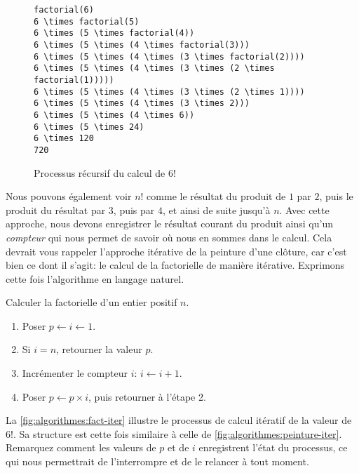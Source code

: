 \begin{figure}
  \centering
  \begin{minipage}{0.67\linewidth}
\begin{Verbatim}[commandchars=\\\{\}]
factorial(6)
6 \times factorial(5)
6 \times (5 \times factorial(4))
6 \times (5 \times (4 \times factorial(3)))
6 \times (5 \times (4 \times (3 \times factorial(2))))
6 \times (5 \times (4 \times (3 \times (2 \times factorial(1)))))
6 \times (5 \times (4 \times (3 \times (2 \times 1))))
6 \times (5 \times (4 \times (3 \times 2)))
6 \times (5 \times (4 \times 6))
6 \times (5 \times 24)
6 \times 120
720
\end{Verbatim}
  \end{minipage}
  \caption{Processus récursif du calcul de $6!$}
  \label{fig:algorithmes:factorial}
\end{figure}

Nous pouvons également voir $n!$ comme le résultat du produit de $1$
par $2$, puis le produit du résultat par $3$, puis par $4$, et ainsi
de suite jusqu'à $n$. Avec cette approche, nous devons enregistrer le
résultat courant du produit ainsi qu'un
\emph{compteur} qui nous permet de savoir où nous en
sommes dans le calcul. Cela devrait vous rappeler l'approche itérative
de la peinture d'une clôture, car c'est bien ce dont il s'agit: le
calcul de la factorielle de manière itérative.
Exprimons cette fois l'algorithme en langage naturel.

\begin{algorithme}
  Calculer la factorielle d'un entier positif $n$.
  \begin{enumerate}
  \item Poser $p \leftarrow i \leftarrow 1$.
  \item Si $i = n$, retourner la valeur $p$.
  \item Incrémenter le compteur $i$: $i \leftarrow i + 1$.
  \item Poser $p \leftarrow p \times i$, puis retourner à l'étape 2.
  \end{enumerate}
\end{algorithme}

La \autoref{fig:algorithmes:fact-iter} illustre le processus de calcul
itératif de la valeur de $6!$. Sa structure est cette fois similaire à
celle de \autoref{fig:algorithmes:peinture-iter}. Remarquez comment
les valeurs de $p$ et de $i$ enregistrent l'état du processus, ce qui
nous permettrait de l'interrompre et de le relancer à tout moment.

